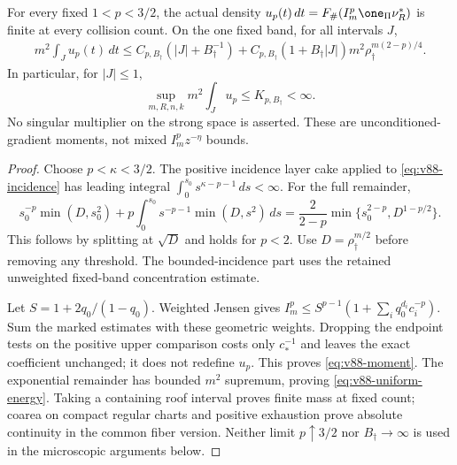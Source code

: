 \begin{theorem}
\label{thm:v88-moment}
For every fixed $1<p<3/2$, the actual density
$u_p(t)\,dt=F_\#(I_m^p\one_\Pi\nu_R^*)$ is finite at every
collision count. On the one fixed band, for all intervals $J$,
\begin{align}
 m^2\int_Ju_p(t)\,dt\le C_{p,B_\dagger}(|J|+B_\dagger^{-1})
 +C_{p,B_\dagger}(1+B_\dagger|J|)m^2
                    \rho_\dagger^{m(2-p)/4}. \label{eq:v88-moment}
\end{align}
In particular, for $|J|\le1$,
\begin{equation}\label{eq:v88-uniform-energy}
       \sup_{m,R,n,k}m^2\int_Ju_p\le K_{p,B_\dagger}<\infty.
\end{equation}
No singular multiplier on the strong space is asserted. These are
unconditioned-gradient moments, not mixed $I_m^pz^{-\eta}$ bounds.
\end{theorem}
\begin{proof}
Choose $p<\kappa<3/2$. The positive incidence layer cake applied to
\eqref{eq:v88-incidence} has leading integral
$\int_0^{s_0}s^{\kappa-p-1}\,ds<\infty$. For the full remainder,
\[
 s_0^{-p}\min(D,s_0^2)+p\int_0^{s_0}s^{-p-1}\min(D,s^2)\,ds
      =\frac2{2-p}\min\{s_0^{2-p},D^{1-p/2}\}.
\]
This follows by splitting at $\sqrt D$ and holds for $p<2$.
Use $D=\rho_\dagger^{m/2}$ before removing any threshold. The
bounded-incidence part uses the retained unweighted fixed-band
concentration estimate.

Let $S=1+2q_0/(1-q_0)$. Weighted Jensen gives
$I_m^p\le S^{p-1}(1+\sum_iq_0^{d_i}c_i^{-p})$.
Sum the marked estimates with these geometric weights. Dropping the
endpoint tests on the positive upper comparison costs only $c_*^{-1}$
and leaves the exact coefficient unchanged; it does not redefine
$u_p$. This proves \eqref{eq:v88-moment}. The exponential remainder
has bounded $m^2$ supremum, proving \eqref{eq:v88-uniform-energy}.
Taking a containing roof interval proves finite mass at fixed count;
coarea on compact regular charts and positive exhaustion prove absolute
continuity in the common fiber version. Neither limit $p\uparrow3/2$
nor $B_\dagger\to\infty$ is used in the microscopic arguments below.
\end{proof}
